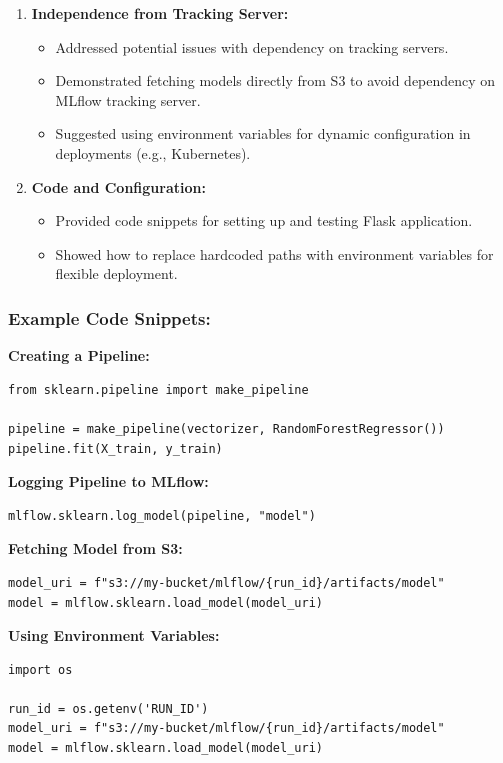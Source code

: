 \documentclass[letterpaper,12pt,notitlepage,twoside]{report}
\begin{document}
\begin{enumerate}
    \item \textbf{Independence from Tracking Server:}
    \begin{itemize}
        \item Addressed potential issues with dependency on tracking servers.
        \item Demonstrated fetching models directly from S3 to avoid dependency on MLflow tracking server.
        \item Suggested using environment variables for dynamic configuration in deployments (e.g., Kubernetes).
    \end{itemize}
    
    \item \textbf{Code and Configuration:}
    \begin{itemize}
        \item Provided code snippets for setting up and testing Flask application.
        \item Showed how to replace hardcoded paths with environment variables for flexible deployment.
    \end{itemize}
\end{enumerate}

\subsubsection*{Example Code Snippets:}
\textbf{Creating a Pipeline:}
\begin{verbatim}
from sklearn.pipeline import make_pipeline

pipeline = make_pipeline(vectorizer, RandomForestRegressor())
pipeline.fit(X_train, y_train)
\end{verbatim}

\textbf{Logging Pipeline to MLflow:}
\begin{verbatim}
mlflow.sklearn.log_model(pipeline, "model")
\end{verbatim}

\textbf{Fetching Model from S3:}
\begin{verbatim}
model_uri = f"s3://my-bucket/mlflow/{run_id}/artifacts/model"
model = mlflow.sklearn.load_model(model_uri)
\end{verbatim}

\textbf{Using Environment Variables:}
\begin{verbatim}
import os

run_id = os.getenv('RUN_ID')
model_uri = f"s3://my-bucket/mlflow/{run_id}/artifacts/model"
model = mlflow.sklearn.load_model(model_uri)
\end{verbatim}
\end{document}
